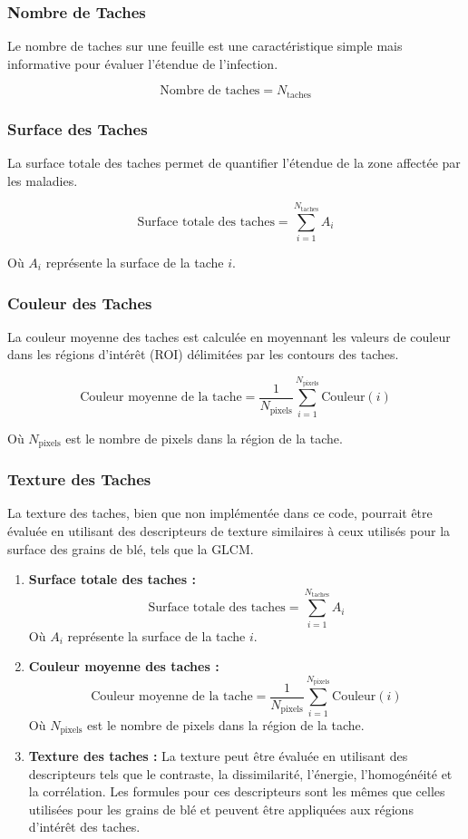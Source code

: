 \documentclass{article}
\begin{document}
	\subsubsection*{Nombre de Taches}
	Le nombre de taches sur une feuille est une caractéristique simple mais informative pour évaluer l'étendue de l'infection.
	
	\[
	\text{Nombre de taches} = N_{\text{taches}}
	\]
	
	\subsubsection*{Surface des Taches}
	La surface totale des taches permet de quantifier l'étendue de la zone affectée par les maladies.
	
	\[
	\text{Surface totale des taches} = \sum_{i=1}^{N_{\text{taches}}} A_i
	\]
	
	Où \( A_i \) représente la surface de la tache \( i \).
	
	\subsubsection*{Couleur des Taches}
	La couleur moyenne des taches est calculée en moyennant les valeurs de couleur dans les régions d'intérêt (ROI) délimitées par les contours des taches.
	
	\[
	\text{Couleur moyenne de la tache} = \frac{1}{N_{\text{pixels}}} \sum_{i=1}^{N_{\text{pixels}}} \text{Couleur}(i)
	\]
	
	Où \( N_{\text{pixels}} \) est le nombre de pixels dans la région de la tache.
	
	\subsubsection*{Texture des Taches}
	La texture des taches, bien que non implémentée dans ce code, pourrait être évaluée en utilisant des descripteurs de texture similaires à ceux utilisés pour la surface des grains de blé, tels que la GLCM.
	
	
	\begin{enumerate}
		\item \textbf{Surface totale des taches :}
		\[
		\text{Surface totale des taches} = \sum_{i=1}^{N_{\text{taches}}} A_i
		\]
		Où \( A_i \) représente la surface de la tache \( i \).
		
		\item \textbf{Couleur moyenne des taches :}
		\[
		\text{Couleur moyenne de la tache} = \frac{1}{N_{\text{pixels}}} \sum_{i=1}^{N_{\text{pixels}}} \text{Couleur}(i)
		\]
		Où \( N_{\text{pixels}} \) est le nombre de pixels dans la région de la tache.
		
		\item \textbf{Texture des taches :}
		La texture peut être évaluée en utilisant des descripteurs tels que le contraste, la dissimilarité, l'énergie, l'homogénéité et la corrélation. Les formules pour ces descripteurs sont les mêmes que celles utilisées pour les grains de blé et peuvent être appliquées aux régions d'intérêt des taches.
	\end{enumerate}
	
\end{document}
